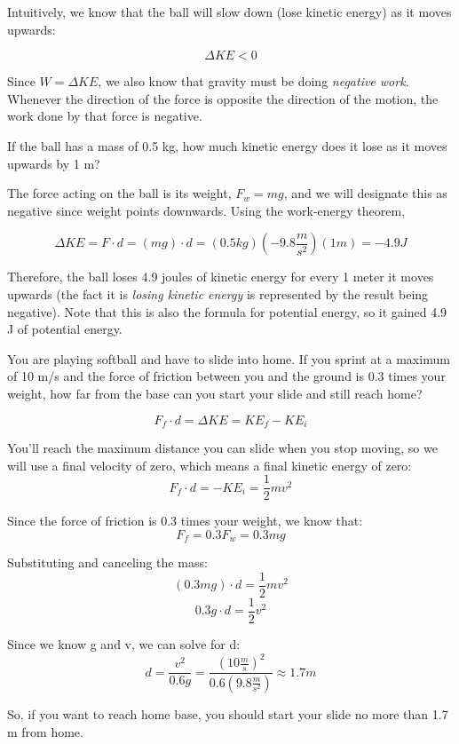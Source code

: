 Intuitively, we know that the ball will slow down (lose kinetic energy) as it 
moves upwards:

$$\Delta KE < 0$$

Since $W = \Delta KE$, we also know that gravity must be doing \textit{negative 
work}. Whenever the direction of the force is opposite the direction of the 
motion, the work done by that force is negative. 
\begin{Exercise}[title=A ball thrown upwards, label=ball_energy]
If the ball has a mass of 0.5 kg, how much kinetic energy does it lose as it moves upwards by 1 m?
\end{Exercise}
\begin{Answer}[ref=ball_energy]
The force acting on the ball is its weight, $F_w = mg$, and we 
will designate this as negative since weight points downwards. Using the 
work-energy theorem, 

$$\Delta KE = F \cdot d = \left( mg \right) \cdot d = \left( 0.5 kg \right) \left(
-9.8 \frac{m}{s^2} \right) \left( 1 m \right) = -4.9 J$$

Therefore, the ball loses 4.9 joules of kinetic energy for every 1 meter it moves 
upwards (the fact it is \textit{losing kinetic energy} is represented by the 
result being negative). Note that this is also the formula for potential energy, so it gained 4.9 J of potential energy.
\end{Answer}

\begin{Exercise}[title = {How far will you slide?}, label = slide]
You are playing softball and have to slide into home. If you sprint at a maximum 
of 10 m/s and the force of friction between you and the ground is 0.3 times your 
weight, how far from the base can you start your slide and still reach home?
\end{Exercise}

\begin{Answer}[ref = slide]
$$F_f \cdot d = \Delta KE = KE_f - KE_i$$

You'll reach the maximum distance you can slide when you stop moving, so we will 
use a final velocity of zero, which means a final kinetic energy of zero:
$$F_f \cdot d = -KE_i = \frac{1}{2}mv^2$$

Since the force of friction is 0.3 times your weight, we know that:
$$F_f = 0.3 F_w = 0.3mg$$

Substituting and canceling the mass:
$$\left( 0.3 mg \right) \cdot d = \frac{1}{2}mv^2$$
$$0.3g \cdot d = \frac{1}{2}v^2$$

Since we know g and v, we can solve for d:
$$d = \frac{v^2}{0.6g} = \frac{\left( 10 \frac{m}{s} \right)^2}{0.6 \left( 9.8 
\frac{m}{s^2} \right)} \approx 1.7 m$$

So, if you want to reach home base, you should start your slide no more than 
1.7 m from home. 
\end{Answer}

